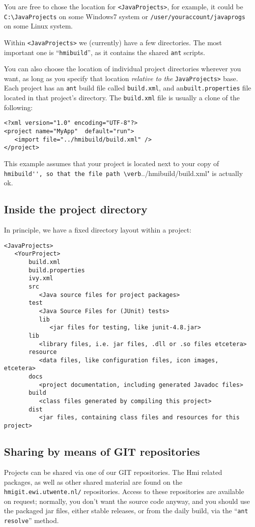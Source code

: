 You are free to chose the location for \verb"<JavaProjects>", for example, it could be
\verb"C:\JavaProjects" on some Windows7 system or \verb"/user/youraccount/javaprogs" on some Linux system.

Within \verb"<JavaProjects>"  we (currently) have a few directories.
The most important one is ``\verb"hmibuild"'', as it contains the shared \verb"ant" scripts. 

You can also choose the location of individual project directories wherever you want,
as long as you specify that location \emph{relative to the } \verb"JavaProjects>" base.
Each project has an \verb"ant" build file called \verb"build.xml", and an\verb"built.properties" file
located in that project's directory.
The \verb"build.xml" file is usually a clone of the following:
\begin{verbatim}
<?xml version="1.0" encoding="UTF-8"?>
<project name="MyApp"  default="run">
   <import file="../hmibuild/build.xml" />
</project>
\end{verbatim}

This example assumes that your project is located next to your copy of \verb"hmibuild'', so that the file path \verb"../hmibuild/build.xml"
is actually ok. 

\subsection{Inside the project directory}

In principle, we have a fixed directory layout within a project:

\begin{verbatim}
<JavaProjects>
   <YourProject>
       build.xml
       build.properties
       ivy.xml
       src
          <Java source files for project packages>
       test
          <Java Source Files for (JUnit) tests>
          lib
             <jar files for testing, like junit-4.8.jar>
       lib
          <library files, i.e. jar files, .dll or .so files etcetera>
       resource
          <data files, like configuration files, icon images, etcetera>
       docs
          <project documentation, including generated Javadoc files>
       build
          <class files generated by compiling this project>
       dist
          <jar files, containing class files and resources for this project>
\end{verbatim}

\subsection{Sharing by means of GIT repositories}
Projects can be shared via one of our GIT repositories.
The Hmi related packages, as well as other shared material are found on the
\verb"hmigit.ewi.utwente.nl/" repositories.
Access to these repositories are available on request; normally, you don't want the source code anyway, and you should use
the packaged jar files, either stable releases, or from the daily build, via the ``\verb"ant resolve"'' method.

